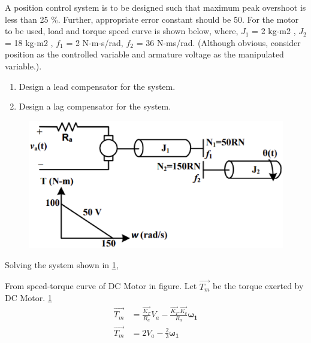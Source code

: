 \item A position control system is to be designed such that maximum peak overshoot is less than 25 \%.
Further, appropriate error constant should be 50. For the motor to be used, load and torque
speed curve is shown below, where, $J_{1}$ = 2 kg-m2
, $J_{2}$ = 18 kg-m2
, $f_{1}$ = 2 N-m-s/rad, $f_{2}$ = 36 N-ms/rad. (Although obvious, consider position as the controlled variable and armature voltage as
the manipulated variable.). 
\begin{enumerate}[label=(\roman*)]
\item Design a lead compensator for the system.
\item Design a lag compensator for the system.
\end{enumerate}

\begin{figure}[!ht]
\centering
    \includegraphics[width=\columnwidth]{./figs/ee18btech11001/ee18btech11001_1.eps}
  \caption{}
  \label{fig:ee18btech11001_fig1}
\end{figure}
%
\solution
Solving the system shown in \ref{fig:ee18btech11001_fig1},

From speed-torque curve of DC Motor in figure. Let $\vec{T_{m}}$ be the torque exerted by DC Motor.  \ref{fig:ee18btech11001_fig1}
\begin{align}
   \vec{T_{m}} &=  \frac{\vec{K_{T}}}{R_{a}}V_{a} - \frac{\vec{K_{T}}.\vec{K_{v}}}{R_{a}}\bm{\omega_{1}}
   \\
   \vec{T_{m}} &=  2V_{a} - \frac{2}{3}\bm{\omega_{1}}
    \label{eq:ee18btech11001_1}
\end{align}

